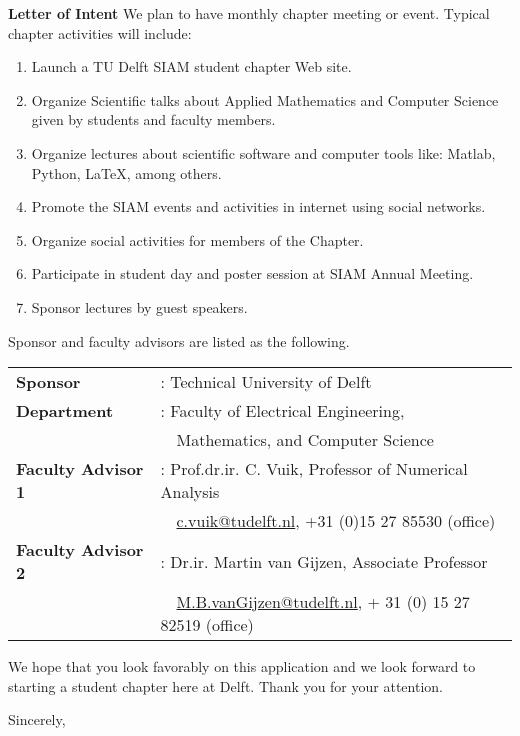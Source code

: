 \documentclass[letterpaper,12pt]{letter}
\begin{document}
\begin{letter}{\textbf{Letter of Intent}}
We plan to have monthly chapter meeting or event. Typical chapter activities will include:
\begin{enumerate}
\item Launch a TU Delft SIAM student chapter Web site.
\item Organize Scientific talks about Applied Mathematics and Computer Science given by students and faculty members.
\item Organize lectures about scientific software and computer tools like: Matlab, Python, \LaTeX, among others. 
\item Promote the SIAM events and activities in internet using social networks.
\item Organize social activities for members of the Chapter.
\item Participate in student day and poster session at SIAM Annual Meeting.
\item Sponsor lectures by guest speakers.
\end{enumerate}
\newpage
Sponsor and faculty advisors are listed as the following.

\begin{tabular}{ll}
\textbf{Sponsor} &: Technical University of Delft \\
\textbf{Department} &: Faculty of Electrical Engineering, \\
&\ \ Mathematics, and Computer Science \\
\textbf{Faculty Advisor 1} &: Prof.dr.ir. C. Vuik, Professor of Numerical Analysis \\
&\ \ \href{C.Vuik@tudelft.nl}{c.vuik@tudelft.nl}, +31 (0)15 27 85530 (office) \\
\textbf{Faculty Advisor 2} &: Dr.ir. Martin van Gijzen, Associate Professor \\
&\ \ \href{M.B.vanGijzen@tudelft.nl}{M.B.vanGijzen@tudelft.nl}, + 31 (0) 15 27 82519 (office) \\
\end{tabular}

\bigskip

We hope that you look favorably on this application and we look forward to starting a student chapter here at Delft. Thank you for your attention.

\closing{Sincerely,}


\end{letter}
\end{document}
